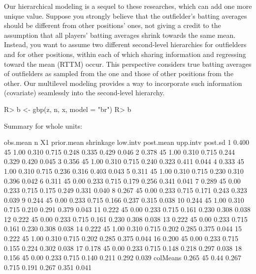 \documentclass[article]{jss}
\begin{document}
Our hierarchical modeling is a sequel to these researches, which can add one more unique value. Suppose you strongly believe that the outfielder's batting averages should be different from other positions' ones, not giving a credit to the assumption that all players' batting averages shrink towards the same mean. Instead, you want to assume two different second-level hierarchies for outfielders and for other positions, within each of which sharing information and regressing toward the mean (RTTM) occur. This perspective considers true batting averages of outfielders as sampled from the one and those of other positions from the other. Our multilevel modeling provides a way to incorporate such information (covariate) seamlessly into the second-level hierarchy.
\begin{CodeChunk}
\begin{CodeInput}
R> b <- gbp(z, n, x, model = "br")
R> b
\end{CodeInput}
\begin{CodeOutput}
Summary for whole units: 

         obs.mean  n   X1 prior.mean shrinkage low.intv post.mean upp.intv post.sd
1           0.400 45 1.00      0.310     0.715    0.248     0.335    0.429   0.046
2           0.378 45 1.00      0.310     0.715    0.244     0.329    0.420   0.045
3           0.356 45 1.00      0.310     0.715    0.240     0.323    0.411   0.044
4           0.333 45 1.00      0.310     0.715    0.236     0.316    0.403   0.043
5           0.311 45 1.00      0.310     0.715    0.230     0.310    0.396   0.042
6           0.311 45 0.00      0.233     0.715    0.179     0.256    0.341   0.041
7           0.289 45 0.00      0.233     0.715    0.175     0.249    0.331   0.040
8           0.267 45 0.00      0.233     0.715    0.171     0.243    0.323   0.039
9           0.244 45 0.00      0.233     0.715    0.166     0.237    0.315   0.038
10          0.244 45 1.00      0.310     0.715    0.210     0.291    0.379   0.043
11          0.222 45 0.00      0.233     0.715    0.161     0.230    0.308   0.038
12          0.222 45 0.00      0.233     0.715    0.161     0.230    0.308   0.038
13          0.222 45 0.00      0.233     0.715    0.161     0.230    0.308   0.038
14          0.222 45 1.00      0.310     0.715    0.202     0.285    0.375   0.044
15          0.222 45 1.00      0.310     0.715    0.202     0.285    0.375   0.044
16          0.200 45 0.00      0.233     0.715    0.155     0.224    0.302   0.038
17          0.178 45 0.00      0.233     0.715    0.148     0.218    0.297   0.038
18          0.156 45 0.00      0.233     0.715    0.140     0.211    0.292   0.039
colMeans    0.265 45 0.44      0.267     0.715    0.191     0.267    0.351   0.041
\end{CodeOutput}
\end{CodeChunk}
\end{document}
